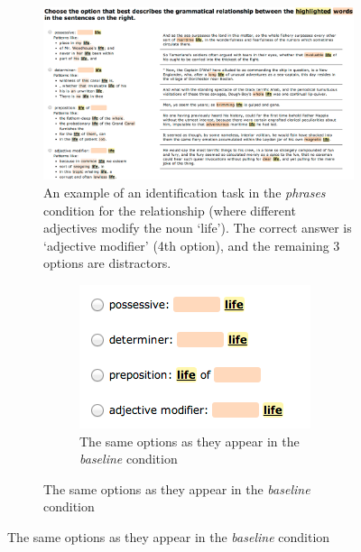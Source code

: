 
\begin{figure}
	\begin{subfigure} {1.3\columnwidth}
			\centering
	\includegraphics[width=1.2\columnwidth]{fig/task}
	\caption{\label{fig:task} An example of an identification task in the \emph{phrases} condition for the relationship  (where different adjectives modify the noun `life'). The correct answer is `adjective modifier' (4th option), and the remaining 3 options are distractors.}
	\end{subfigure}
	\qquad\qquad\qquad
	\begin{subfigure}{0.7\columnwidth}
		\begin{subfigure}{0.7\columnwidth}
				\centering
		\includegraphics[width=0.9\columnwidth]{fig/baseline-choices}
	    \caption {The same options as they appear in the \emph{baseline} condition \label{fig:baseline-choices}}
	    \end{subfigure}



\end{subfigure}
\end{figure}
